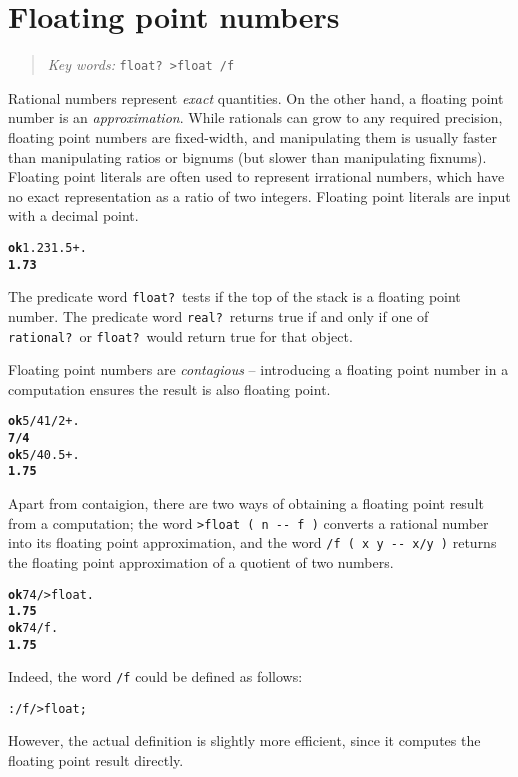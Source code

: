 \documentclass[english]{book}
\newcommand{\chapkeywords}[1]{{\parbox{10cm}{\begin{minipage}[b]{10cm}
\begin{quote}
\emph{Key words:} \texttt{#1}
\end{quote}
\end{minipage}}}}
\begin{document}
\section{Floating point numbers}

\chapkeywords{float?~>float /f}

Rational numbers represent \emph{exact} quantities. On the other hand, a floating point number is an \emph{approximation}. While rationals can grow to any required precision, floating point numbers are fixed-width, and manipulating them is usually faster than manipulating ratios or bignums (but slower than manipulating fixnums). Floating point literals are often used to represent irrational numbers, which have no exact representation as a ratio of two integers. Floating point literals are input with a decimal point.

\begin{alltt}
\textbf{ok} 1.23 1.5 + .
\textbf{1.73}
\end{alltt}

The predicate word \texttt{float?}~tests if the top of the stack is a floating point number. The predicate word \texttt{real?}~returns true if and only if one of \texttt{rational?}~or \texttt{float?}~would return true for that object.

Floating point numbers are \emph{contagious} -- introducing a floating point number in a computation ensures the result is also floating point.

\begin{alltt}
\textbf{ok} 5/4 1/2 + .
\textbf{7/4}
\textbf{ok} 5/4 0.5 + .
\textbf{1.75}
\end{alltt}

Apart from contaigion, there are two ways of obtaining a floating point result from a computation; the word \texttt{>float ( n -{}- f )} converts a rational number into its floating point approximation, and the word \texttt{/f ( x y -{}- x/y )} returns the floating point approximation of a quotient of two numbers.

\begin{alltt}
\textbf{ok} 7 4 / >float .
\textbf{1.75}
\textbf{ok} 7 4 /f .
\textbf{1.75}
\end{alltt}

Indeed, the word \texttt{/f} could be defined as follows:

\begin{alltt}
: /f / >float ;
\end{alltt}

However, the actual definition is slightly more efficient, since it computes the floating point result directly.
\end{document}
